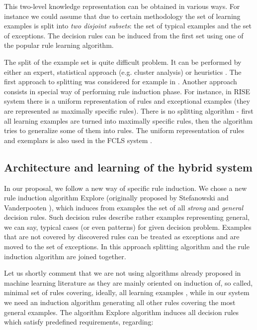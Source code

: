 \documentclass{article}
\begin{document}
This two-level knowledge representation can be obtained in various
ways. For instance we could assume that due to certain methodology
the set of learning examples is split into {\em two disjoint
subsets}: the set of typical examples and the set of exceptions.
The decision rules can be induced from the first set using one of
the popular rule learning algorithm.

The split of the example set is quite difficult problem. It can be
performed by either an expert, statistical approach (e.g. cluster
analysis) or heuristics \cite{MichZang}. The first approach to
splitting was considered for example in \cite{Surma}. Another
approach consists in special way of performing rule induction
phase. For instance, in RISE system \cite{Domingos} there is a
uniform representation of rules and exceptional examples (they are
represented as maximally specific rules). There is no splitting
algorithm - first all learning examples are turned into maximally
specific rules, then the algorithm tries to generalize some of
them into rules. The uniform representation of rules and exemplars
is also used in the FCLS system \cite {Zhang}.

\subsection{Architecture and learning of the hybrid system}

In our proposal, we follow a new way of specific rule induction. We chose a
new rule induction algorithm Explore (originally proposed by Stefanowski and
Vanderpooten \cite{banff,cahier}), which induces from examples the set of
all {\em strong} and {\em general} decision rules. Such decision rules
describe rather examples representing general, we can say, typical cases (or
even patterns) for given decision problem. Examples that are not covered by
discovered rules can be treated as exceptions and are moved to the set of
exceptions. In this approach splitting algorithm and the rule induction
algorithm are joined together.

Let us shortly comment that we are not using algorithms already
proposed in machine learning literature as they are mainly
oriented on induction of, so called, minimal set of rules
covering, ideally, all learning examples \cite{lers}, while in our
system we need an induction algorithm generating all other rules
covering the most general examples. The algorithm Explore \cite
{cahier,ii} algorithm induces all decision rules which satisfy
predefined requirements, regarding:
\end{document}
